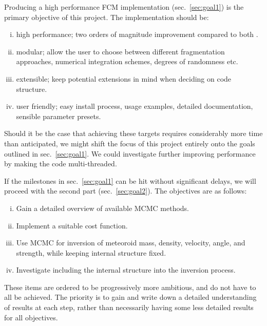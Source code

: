 Producing a high performance FCM implementation (sec.~\ref{sec:goal1}) is the primary objective of this project.
The implementation should be:
\begin{enumerate}[(i)]
    \item high performance; two orders of magnitude improvement compared to both \cite{mehta2015break,newland2019CFM18}.
    \item modular; allow the user to choose between different fragmentation approaches, numerical integration schemes, degrees of randomness etc.
    \item extensible; keep potential extensions in mind when deciding on code structure.
    \item user friendly; easy install process, usage examples, detailed documentation, sensible parameter presets.
\end{enumerate}

Should it be the case that achieving these targets requires considerably more time than anticipated, we might shift the focus of this project entirely onto the goals outlined in sec.~\ref{sec:goal1}.
We could investigate further improving performance by making the code multi-threaded.

If the milestones in sec.~\ref{sec:goal1} can be hit without significant delays, we will proceed with the second part (sec.~\ref{sec:goal2}). The objectives are as follows:
\begin{enumerate}[(i)]
    \item Gain a detailed overview of available MCMC methods.
    \item Implement a suitable cost function.
    \item Use MCMC for inversion of meteoroid mass, density, velocity, angle, and strength, while keeping internal structure fixed.
    \item Investigate including the internal structure into the inversion process.
\end{enumerate}
These items are ordered to be progressively more ambitious, and do not have to all be achieved.
The priority is to gain and write down a detailed understanding of results at each step, rather than necessarily having some less detailed results for all objectives.
